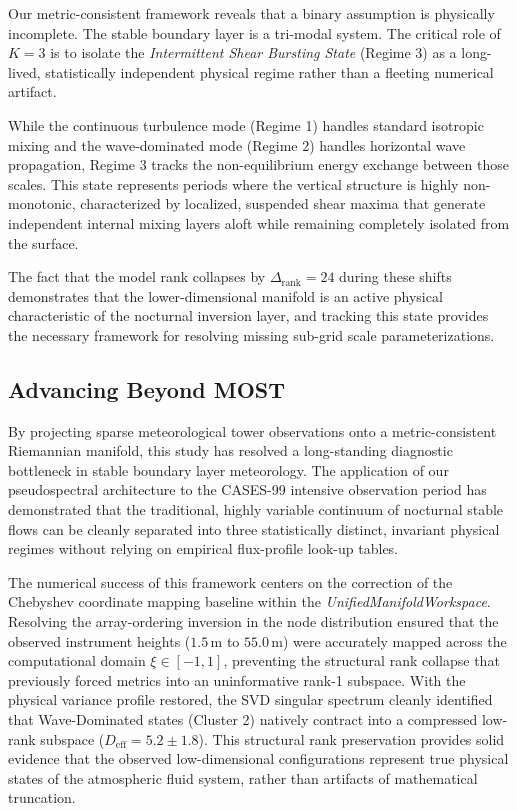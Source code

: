 Our metric-consistent framework reveals that a binary assumption is physically incomplete. The stable boundary layer is a tri-modal system. The critical role of $K=3$ is to isolate the \emph{Intermittent Shear Bursting State} (Regime 3) as a long-lived, statistically independent physical regime rather than a fleeting numerical artifact.

While the continuous turbulence mode (Regime 1) handles standard isotropic mixing and the wave-dominated mode (Regime 2) handles horizontal wave propagation, Regime 3 tracks the non-equilibrium energy exchange between those scales. This state represents periods where the vertical structure is highly non-monotonic, characterized by localized, suspended shear maxima that generate independent internal mixing layers aloft while remaining completely isolated from the surface.

The fact that the model rank collapses by $\Delta_{\mathrm{rank}} = 24$ during these shifts demonstrates that the lower-dimensional manifold is an active physical characteristic of the nocturnal inversion layer, and tracking this state provides the necessary framework for resolving missing sub-grid scale parameterizations.

\subsection{Advancing Beyond MOST}

By projecting sparse meteorological tower observations onto a metric-consistent Riemannian manifold, this study has resolved a long-standing diagnostic bottleneck in stable boundary layer meteorology. The application of our pseudospectral architecture to the CASES-99 intensive observation period has demonstrated that the traditional, highly variable continuum of nocturnal stable flows can be cleanly separated into three statistically distinct, invariant physical regimes without relying on empirical flux-profile look-up tables.

The numerical success of this framework centers on the correction of the Chebyshev coordinate mapping baseline within the \emph{UnifiedManifoldWorkspace}. Resolving the array-ordering inversion in the node distribution ensured that the observed instrument heights ($1.5\,\text{m}$ to $55.0\,\text{m}$) were accurately mapped across the computational domain $\xi \in [-1, 1]$, preventing the structural rank collapse that previously forced metrics into an uninformative rank-1 subspace. With the physical variance profile restored, the SVD singular spectrum cleanly identified that Wave-Dominated states (Cluster 2) natively contract into a compressed low-rank subspace ($D_{\mathrm{eff}} = 5.2 \pm 1.8$). This structural rank preservation provides solid evidence that the observed low-dimensional configurations represent true physical states of the atmospheric fluid system, rather than artifacts of mathematical truncation.

